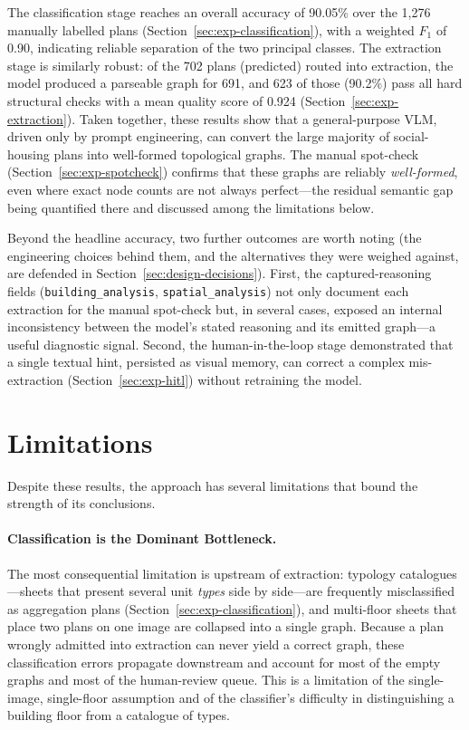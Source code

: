 \documentclass[12pt,a4paper,openright]{report}
\newcommand{\code}[1]{\texttt{#1}}
\begin{document}
The classification stage reaches an overall accuracy of 90.05\% over the 1,276 manually labelled plans (Section~\ref{sec:exp-classification}), with a weighted $F_1$ of 0.90, indicating reliable separation of the two principal classes. The extraction stage is similarly robust: of the 702 plans (predicted) routed into extraction, the model produced a parseable graph for 691, and 623 of those (90.2\%) pass all hard structural checks with a mean quality score of 0.924 (Section~\ref{sec:exp-extraction}). Taken together, these results show that a general-purpose VLM, driven only by prompt engineering, can convert the large majority of social-housing plans into well-formed topological graphs. The manual spot-check (Section~\ref{sec:exp-spotcheck}) confirms that these graphs are reliably \emph{well-formed}, even where exact node counts are not always perfect---the residual semantic gap being quantified there and discussed among the limitations below.

Beyond the headline accuracy, two further outcomes are worth noting (the engineering choices behind them, and the alternatives they were weighed against, are defended in Section~\ref{sec:design-decisions}). First, the captured-reasoning fields (\code{building\_analysis}, \code{spatial\_analysis}) not only document each extraction for the manual spot-check but, in several cases, exposed an internal inconsistency between the model's stated reasoning and its emitted
graph---a useful diagnostic signal. Second, the human-in-the-loop stage demonstrated that a single textual hint, persisted as visual memory, can correct a complex mis-extraction (Section~\ref{sec:exp-hitl}) without retraining the model.

\section{Limitations}

Despite these results, the approach has several limitations that bound the
strength of its conclusions.

\paragraph{Classification is the Dominant Bottleneck.} The most consequential
limitation is upstream of extraction: typology catalogues---sheets that present several unit \emph{types} side by side---are frequently misclassified as aggregation plans (Section~\ref{sec:exp-classification}), and multi-floor sheets that place two plans on one image are collapsed into a single graph. Because a plan wrongly admitted into extraction can never yield a correct graph, these
classification errors propagate downstream and account for most of the empty graphs and most of the human-review queue. This is a limitation of the single-image, single-floor assumption and of the classifier's difficulty in distinguishing a building floor from a catalogue of types.
\end{document}
